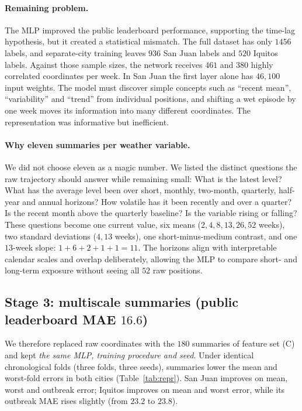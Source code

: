 \documentclass[11pt,a4paper]{article}
\begin{document}
\paragraph{Remaining problem.} The MLP improved the public leaderboard performance, supporting the time-lag hypothesis, but it created a statistical mismatch. The full dataset has only $1456$ labels, and separate-city training leaves $936$ San Juan labels and $520$ Iquitos labels. Against those sample sizes, the network receives $461$ and $380$ highly correlated coordinates per week. In San Juan the first layer alone has $46{,}100$ input weights. The model must discover simple concepts such as ``recent mean'', ``variability'' and ``trend'' from individual positions, and shifting a wet episode by one week moves its information into many different coordinates. The representation was informative but inefficient.

\paragraph{Why eleven summaries per weather variable.} We did not choose eleven as a magic number. We listed the distinct questions the raw trajectory should answer while remaining small: What is the latest level? What has the average level been over short, monthly, two-month, quarterly, half-year and annual horizons? How volatile has it been recently and over a quarter? Is the recent month above the quarterly baseline? Is the variable rising or falling? These questions become one current value, six means ($2,4,8,13,26,52$ weeks), two standard deviations ($4,13$ weeks), one short-minus-medium contrast, and one $13$-week slope: $1+6+2+1+1=11$. The horizons align with interpretable calendar scales and overlap deliberately, allowing the MLP to compare short- and long-term exposure without seeing all $52$ raw positions.

\subsection{Stage 3: multiscale summaries (public leaderboard MAE $16.6$)}
We therefore replaced raw coordinates with the $180$ summaries of feature set (C) and kept \emph{the same MLP, training procedure and seed}. Under identical chronological folds (three folds, three seeds), summaries lower the mean and worst-fold errors in both cities (Table~\ref{tab:repr}). San Juan improves on mean, worst and outbreak error; Iquitos improves on mean and worst error, while its outbreak MAE rises slightly (from $23.2$ to $23.8$).
\end{document}
